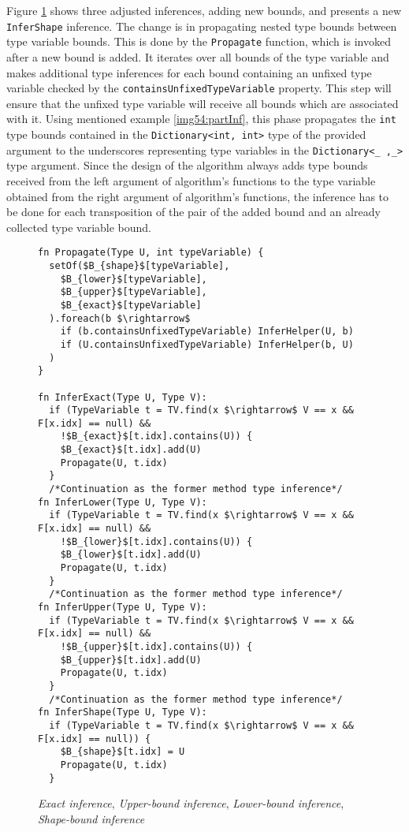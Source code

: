 Figure \ref{img55:mainTypeInference2} shows three adjusted inferences, adding new bounds, and presents a new \texttt{InferShape} inference.
The change is in propagating nested type bounds between type variable bounds. 
This is done by the \texttt{Propagate} function, which is invoked after a new bound is added. 
It iterates over all bounds of the type variable and makes additional type inferences for each bound containing an unfixed type variable checked by the \texttt{containsUnfixedTypeVariable} property. 
This step will ensure that the unfixed type variable will receive all bounds which are associated with it. 
Using mentioned example \ref{img54:partInf}, this phase propagates the  \texttt{int} type bounds contained in the \texttt{Dictionary<int, int>} type of the provided argument to the underscores representing type variables in the \texttt{Dictionary<\_ ,\_>} type argument.
Since the design of the algorithm always adds type bounds received from the left argument of algorithm's functions to the type variable obtained from the right argument of algorithm's functions, the inference has to be done for each transposition of the pair of the added bound and an already collected type variable bound.
\begin{figure}[h!]
\begin{lstlisting}[style=myAlgo, mathescape=true]
fn Propagate(Type U, int typeVariable) {
  setOf($B_{shape}$[typeVariable],
    $B_{lower}$[typeVariable],
    $B_{upper}$[typeVariable],
    $B_{exact}$[typeVariable]
  ).foreach(b $\rightarrow$
    if (b.containsUnfixedTypeVariable) InferHelper(U, b)
    if (U.containsUnfixedTypeVariable) InferHelper(b, U)
  )
}

fn InferExact(Type U, Type V):
  if (TypeVariable t = TV.find(x $\rightarrow$ V == x && F[x.idx] == null) &&
    !$B_{exact}$[t.idx].contains(U)) {
    $B_{exact}$[t.idx].add(U)
    Propagate(U, t.idx)
  }
  /*Continuation as the former method type inference*/
fn InferLower(Type U, Type V):
  if (TypeVariable t = TV.find(x $\rightarrow$ V == x && F[x.idx] == null) &&
    !$B_{lower}$[t.idx].contains(U)) {
    $B_{lower}$[t.idx].add(U)
    Propagate(U, t.idx)
  }
  /*Continuation as the former method type inference*/
fn InferUpper(Type U, Type V):
  if (TypeVariable t = TV.find(x $\rightarrow$ V == x && F[x.idx] == null) &&
    !$B_{upper}$[t.idx].contains(U)) {
    $B_{upper}$[t.idx].add(U)
    Propagate(U, t.idx)
  }
  /*Continuation as the former method type inference*/
fn InferShape(Type U, Type V):
  if (TypeVariable t = TV.find(x $\rightarrow$ V == x && F[x.idx] == null)) {
    $B_{shape}$[t.idx] = U
    Propagate(U, t.idx)
  }
\end{lstlisting}
\caption{\textit{Exact inference}, \textit{Upper-bound inference}, \textit{Lower-bound inference}, \textit{Shape-bound inference}}
\label{img55:mainTypeInference2}
\end{figure}
